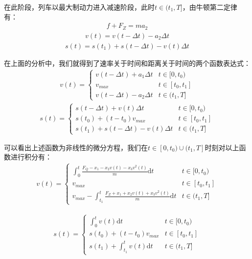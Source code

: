\documentclass[12pt,a4paper]{nmmcm}
\begin{document}
在此阶段，列车以最大制动力进入减速阶段，此时$t\in(t_1,T]$，由牛顿第二定律有：
\begin{eqnarray}
f+F_Z=ma_2
\end{eqnarray}
\begin{eqnarray}
v(t)=v(t-\Delta t)-a_2\Delta t
\end{eqnarray}
\begin{eqnarray}
s(t)=s(t_1)+s(t-\Delta t)-v(t)\Delta t
\end{eqnarray}

在上面的分析中，我们就得到了速率关于时间和距离关于时间的两个函数表达式：
\begin{eqnarray}
v(t)=\left\{\begin{matrix}
 v(t-\Delta t)+a_1\Delta t &t\in[0,t_0) \\
 v_{max} &t\in [t_0,t_1] \\
  v(t-\Delta t)-a_2\Delta t&t\in (t_1,T]
\end{matrix}\right.
\end{eqnarray}
\begin{eqnarray}
s(t)=\left\{\begin{matrix}
 s(t-\Delta t)+v(t)\Delta t &t\in[0,t_0) \\
 s(t_0)+(t-t_0)v_{max} &t\in [t_0,t_1] \\
  s(t_1)+s(t-\Delta t)-v(t)\Delta t&t\in (t_1,T]
\end{matrix}\right.
\end{eqnarray}

可以看出上述函数为非线性的微分方程，我们在$t\in[0,t_0)\cup(t_1,T]$时刻对以上函数进行积分有：
\begin{eqnarray}
v(t)=\left\{\begin{matrix}
 \int_0^t\frac{F_Q-x_1-x_2v(t)-x_3v^2(t)}{m}\mathrm{d}t &t\in[0,t_0) \\
 v_{max} &t\in [t_0,t_1] \\
  v_{max}-\int_{t_1}^{t}\frac{F_Z+x_1+x_2v(t)+x_3v^2(t)}{m}\mathrm{d}t &t\in (t_1,T]
\end{matrix}\right.
\end{eqnarray}

\begin{eqnarray}
s(t)=\left\{\begin{matrix}
 \int_0^tv(t) \mathrm{d}t &t\in[0,t_0) \\
 s(t_0)+(t-t_0)v_{max} &t\in [t_0,t_1] \\
  s(t_1)+\int_{t_1}^tv(t)\mathrm{d}t&t\in (t_1,T]
\end{matrix}\right.
\end{eqnarray}
\end{document}
